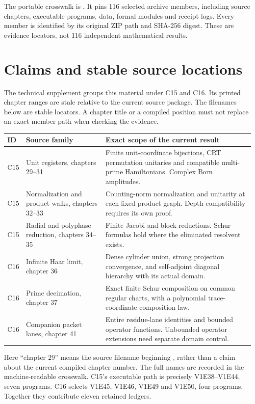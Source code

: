 The portable crosswalk is . It pins 116 selected archive members, including source chapters, executable programs, data, formal modules and receipt logs. Every member is identified by its original ZIP path and SHA-256 digest. These are evidence locators, not 116 independent mathematical results.

\clearpage
\section{Claims and stable source locations}\label{a-verify-claims}

The technical supplement groups this material under C15 and C16. Its printed chapter ranges are stale relative to the current source package. The filenames below are stable locators. A chapter title or a compiled position must not replace an exact member path when checking the evidence.

\begin{longtable}{@{}L{.07\textwidth}L{.38\textwidth}L{.45\textwidth}@{}}
\toprule
ID & Source family & Exact scope of the current result\\
\midrule\endhead
C15 & Unit registers, chapters 29--31 & Finite unit-coordinate bijections, CRT permutation unitaries and compatible multi-prime Hamiltonians. Complex Born amplitudes.\\
C15 & Normalization and product walks, chapters 32--33 & Counting-norm normalization and unitarity at each fixed product graph. Depth compatibility requires its own proof.\\
C15 & Radial and polyphase reduction, chapters 34--35 & Finite Jacobi and block reductions. Schur formulas hold where the eliminated resolvent exists.\\
C16 & Infinite Haar limit, chapter 36 & Dense cylinder union, strong projection convergence, and self-adjoint diagonal hierarchy with its actual domain.\\
C16 & Prime decimation, chapter 37 & Exact finite Schur composition on common regular charts, with a polynomial trace-coordinate composition law.\\
C16 & Companion packet lanes, chapter 41 & Entire residue-lane identities and bounded operator functions. Unbounded operator extensions need separate domain control.\\
\bottomrule
\end{longtable}

Here ``chapter 29'' means the source filename beginning , rather than a claim about the current compiled chapter number. The full names are recorded in the machine-readable crosswalk. C15's executable path is precisely V1E38--V1E44, seven programs. C16 selects V1E45, V1E46, V1E49 and V1E50, four programs. Together they contribute eleven retained ledgers.

